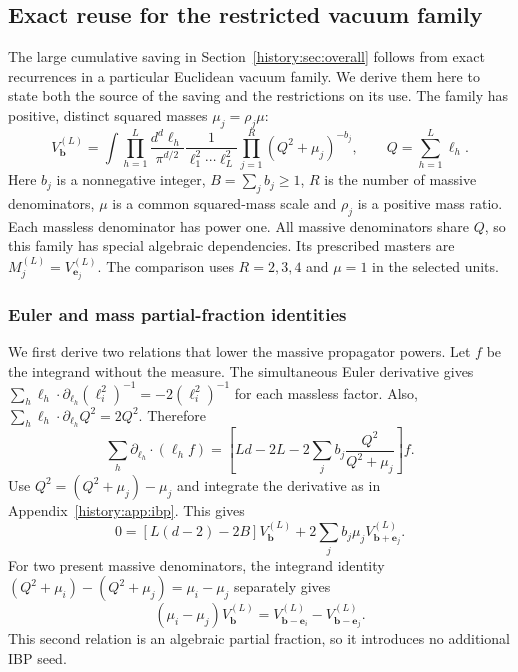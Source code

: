 \subsection{Exact reuse for the restricted vacuum family}
\label{history:app:vacuum}\label{app:vacuum}
The large cumulative saving in Section~\ref{history:sec:overall} follows from exact recurrences in a particular Euclidean vacuum family. We derive them here to state both the source of the saving and the restrictions on its use. The family has positive, distinct squared masses $\mu_j=\rho_j\mu$:
\begin{equation}
 V^{(L)}_{\boldsymbol b}=
 \int\prod_{h=1}^L\frac{d^d\ell_h}{\pi^{d/2}}
 \frac{1}{\ell_1^2\cdots\ell_L^2}
 \prod_{j=1}^{R}(Q^2+\mu_j)^{-b_j},
 \qquad Q=\sum_{h=1}^L\ell_h.
 \label{history:eq:vacuum}
\end{equation}
Here $b_j$ is a nonnegative integer, $B=\sum_jb_j\geq1$, $R$ is the number of massive denominators, $\mu$ is a common squared-mass scale and $\rho_j$ is a positive mass ratio. Each massless denominator has power one. All massive denominators share $Q$, so this family has special algebraic dependencies. Its prescribed masters are $M_j^{(L)}=V^{(L)}_{\boldsymbol e_j}$. The comparison uses $R=2,3,4$ and $\mu=1$ in the selected units.

\subsubsection{Euler and mass partial-fraction identities}
We first derive two relations that lower the massive propagator powers. Let $f$ be the integrand without the measure. The simultaneous Euler derivative gives $\sum_h\ell_h\cdot\partial_{\ell_h}(\ell_i^2)^{-1}=-2(\ell_i^2)^{-1}$ for each massless factor. Also, $\sum_h\ell_h\cdot\partial_{\ell_h}Q^2=2Q^2$. Therefore
\begin{equation}
 \sum_h\partial_{\ell_h}\cdot(\ell_h f)
 =\left[Ld-2L-2\sum_jb_j\frac{Q^2}{Q^2+\mu_j}\right]f.
\end{equation}
Use $Q^2=(Q^2+\mu_j)-\mu_j$ and integrate the derivative as in Appendix~\ref{history:app:ibp}. This gives
\begin{equation}
 0=[L(d-2)-2B]V^{(L)}_{\boldsymbol b}
       +2\sum_j b_j\mu_jV^{(L)}_{\boldsymbol b+\boldsymbol e_j}.
 \label{history:eq:euler-vac}
\end{equation}
For two present massive denominators, the integrand identity
$(Q^2+\mu_i)-(Q^2+\mu_j)=\mu_i-\mu_j$ separately gives
\begin{equation}
 (\mu_i-\mu_j)V_{\boldsymbol b}^{(L)}
   =V_{\boldsymbol b-\boldsymbol e_i}^{(L)}
    -V_{\boldsymbol b-\boldsymbol e_j}^{(L)}.
 \label{history:eq:mass-vac}
\end{equation}
This second relation is an algebraic partial fraction, so it introduces no additional IBP seed.

